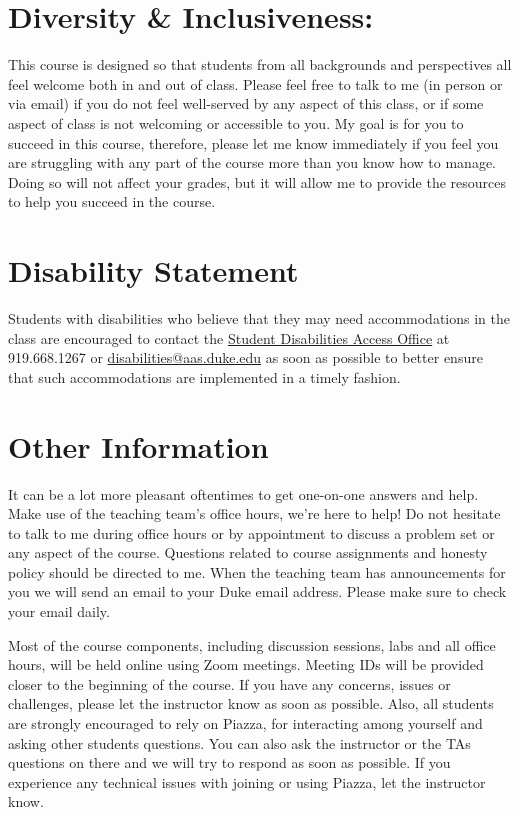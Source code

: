 \documentclass[11pt, a4paper]{article}
\begin{document}
\section{Diversity \& Inclusiveness:}
This course is designed so that students from all backgrounds and perspectives all feel welcome both in and out of class. Please feel free to talk to me (in person or via email) if you do not feel well-served by any aspect of this class, or if some aspect of class is not welcoming or accessible to you. My goal is for you to succeed in this course, therefore, please let me know immediately if you feel you are struggling with any part of the course more than you know how to manage. Doing so will not affect your grades, but it will allow me to provide the resources to help you succeed in the course.


\section{Disability Statement} 
Students with disabilities who believe that they may need accommodations in the class are encouraged to contact the \href{https://access.duke.edu/students/staff.php}{Student Disabilities Access Office} at 919.668.1267 or \href{mailto:disabilities@aas.duke.edu}{disabilities@aas.duke.edu}  as soon as possible to better ensure that such accommodations are implemented in a timely fashion.


\section{Other Information} 
It can be a lot more pleasant oftentimes to get one-on-one answers and help. Make use of the teaching team's office hours, we're here to help! Do not hesitate to talk to me during office hours or by appointment to discuss a problem set or any aspect of the course.  Questions related to course assignments and honesty policy should be directed to me. When the teaching team has announcements for you we will send an email to your Duke email address. Please make sure to check your email daily.

Most of the course components, including discussion sessions, labs and all office hours, will be held online using Zoom meetings. Meeting IDs will be provided closer to the beginning of the course. If you have any concerns, issues or challenges, please let the instructor know as soon as possible. Also, all students are strongly encouraged to rely on Piazza, for interacting among yourself and asking other students questions. You can also ask the instructor or the TAs questions on there and we will try to respond as soon as possible.  If you experience any technical issues with joining or using Piazza, let the instructor know.
\end{document}
